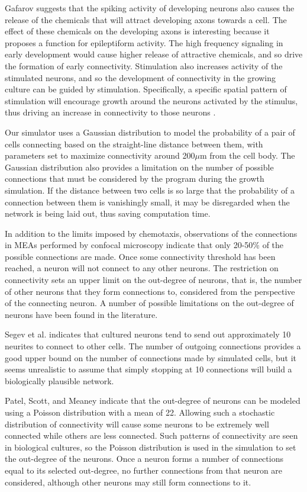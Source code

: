 \documentclass[letterpaper]{article}
\begin{document}
Gafarov \citeyear{gafarov2006self} suggests that the spiking activity of developing neurons also causes the release of the chemicals that will attract developing axons towards a cell. 
The effect of these chemicals on the developing axons is interesting because it proposes a function for epileptiform activity. 
The high frequency signaling in early development would cause higher release of attractive chemicals, and so drive the formation of early connectivity. 
Stimulation also increases activity of the stimulated neurons, and so the development of connectivity in the growing culture can be guided by stimulation. 
Specifically, a specific spatial pattern of stimulation will encourage growth around the neurons activated by the stimulus, thus driving an increase in connectivity to those neurons \cite{zemianek2012accelerated}. 

Our simulator uses a Gaussian distribution to model the probability of a pair of cells connecting based on the straight-line distance between them, with parameters set to maximize connectivity around 200$\mu$m from the cell body. 
The Gaussian distribution also provides a limitation on the number of possible connections that must be considered by the program during the growth simulation. 
If the distance between two cells is so large that the probability of a connection between them is vanishingly small, it may be disregarded when the network is being laid out, thus saving computation time. 

In addition to the limits imposed by chemotaxis, observations of the connections in MEAs performed by confocal microscopy indicate that only 20-50\% of the possible connections are made. 
Once some connectivity threshold has been reached, a neuron will not connect to any other neurons. 
The restriction on connectivity sets an upper limit on the out-degree of neurons, that is, the number of other neurons that they form connections to, considered from the perspective of the connecting neuron. 
A number of possible limitations on the out-degree of neurons have been found in the literature.  

Segev et al. \citeyear{segev2003formation} indicates that cultured neurons tend to send out approximately 10 neurites to connect to other cells. 
The number of outgoing connections provides a good upper bound on the number of connections made by simulated cells, but it seems unrealistic to assume that simply stopping at 10 connections will build a biologically plausible network.

Patel, Scott, and Meaney \citeyear{patel2012dynamic} indicate that the out-degree of neurons can be modeled using a Poisson distribution with a mean of 22. 
Allowing such a stochastic distribution of connectivity will cause some neurons to be extremely well connected while others are less connected. 
Such patterns of connectivity are seen in biological cultures, so the Poisson distribution is used in the simulation to set the out-degree of the neurons. 
Once a neuron forms a number of connections equal to its selected out-degree, no further connections from that neuron are considered, although other neurons may still form connections to it. 
\end{document}
